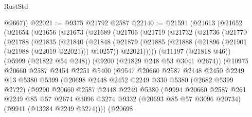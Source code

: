 \begin{lexlean}{RustStd}
\begin{coremodule}
        @9667))
@22021 := @9375 @21792 @2587
@22140 := @21591
    (@21613
      (@21652
        (@21654
          (@21656
            (@21673
              (@21689
                (@21706
                  (@21719
                    (@21732
                      (@21736
                        (@21770
                          (@21788
                            (@21835
                              (@21840
                                (@21848
                                  (@21879
                                    (@21885
                                      (@21888 (@21896 (@21901 (@21988 (@22019 @22021))) @10257))
                                      @22021)))))
                            (@11197 (@21818 @46))
                            (@5999 (@21822 @54 @248))
                            (@9200 (@21829 @248 @53 @3041 @2674))
                            (@10975
                              @20660
                              @2587
                              @2454
                              @2251
                              @5400
                              (@9547
                                @20660
                                @2587
                                @2448
                                @2450
                                @2249
                                @13
                                @5380
                                @5399
                                (@20698
                                  @2448
                                  @2452
                                  @2249
                                  @330
                                  @5380
                                  (@2682 @5399 @2722)
                                  (@9290
                                    @20660
                                    @2587
                                    @2448
                                    @2249
                                    @5380
                                    (@9994
                                      @20660
                                      @2587
                                      @261
                                      @2249
                                      @85
                                      @57
                                      @2674
                                      @3096
                                      @3274
                                      @9332
                                      (@20693 @85 @57 @3096 @20734)
                                      (@9941 (@13284 @2249 @3274))))
                                  (@20698

\end{coremodule}
\end{lexlean}
